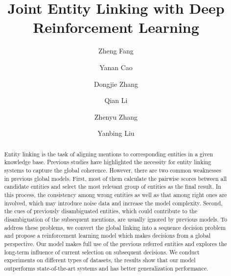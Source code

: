 \documentclass[sigconf]{acmart}
\begin{document}
\title{Joint Entity Linking with Deep Reinforcement Learning}

\author{Zheng Fang}

\author{Yanan Cao}

\author{Dongjie Zhang}

\author{Qian Li}

\author{Zhenyu Zhang}

\author{Yanbing Liu}




\begin{abstract}
Entity linking is the task of aligning mentions to corresponding entities in a given knowledge base. Previous studies have highlighted the necessity for entity linking systems to capture the global coherence. However, there are two common weaknesses in previous global models. First, most of them calculate the pairwise scores between all candidate entities and select the most relevant group of entities as the final result. In this process, the consistency among wrong entities as well as that among right ones are involved, which may introduce noise data and increase the model complexity. Second, the cues of previously disambiguated entities, which could contribute to the disambiguation of the subsequent mentions, are usually ignored by previous models. To address these problems, we convert the global linking into a sequence decision problem and propose a reinforcement learning model which makes decisions from a global perspective. Our model makes full use of the previous referred entities and explores the long-term influence of current selection on subsequent decisions. We conduct experiments on different types of datasets, the results show that our model outperforms state-of-the-art systems and has better generalization performance.
\end{abstract}
\end{document}
